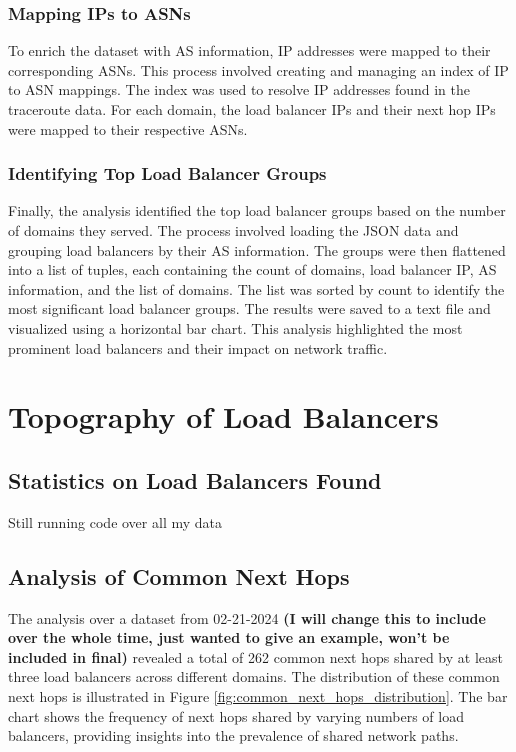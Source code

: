 \documentclass[12pt]{cwru_thesis}
\begin{document}
\subsection{Mapping IPs to ASNs}
To enrich the dataset with AS information, IP addresses were mapped to their corresponding ASNs. This process involved creating and managing an index of IP to ASN mappings. The index was used to resolve IP addresses found in the traceroute data. For each domain, the load balancer IPs and their next hop IPs were mapped to their respective ASNs. 

\subsection{Identifying Top Load Balancer Groups}
Finally, the analysis identified the top load balancer groups based on the number of domains they served. The process involved loading the JSON data and grouping load balancers by their AS information. The groups were then flattened into a list of tuples, each containing the count of domains, load balancer IP, AS information, and the list of domains. The list was sorted by count to identify the most significant load balancer groups. The results were saved to a text file and visualized using a horizontal bar chart. This analysis highlighted the most prominent load balancers and their impact on network traffic.



\chapter{Topography of Load Balancers}
\section{Statistics on Load Balancers Found}

Still running code over all my data

\section{Analysis of Common Next Hops}
The analysis over a dataset from 02-21-2024 \textbf{(I will change this to include over the whole time, just wanted to give an example, won't be included in final)} revealed a total of 262 common next hops shared by at least three load balancers across different domains. The distribution of these common next hops is illustrated in Figure \ref{fig:common_next_hops_distribution}. The bar chart shows the frequency of next hops shared by varying numbers of load balancers, providing insights into the prevalence of shared network paths.
\end{document}
